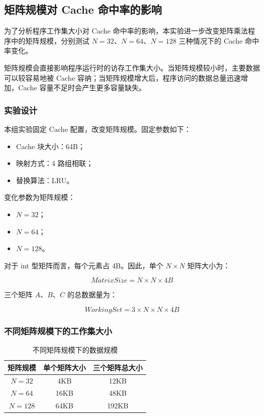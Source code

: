 \subsection{矩阵规模对 Cache 命中率的影响}

为了分析程序工作集大小对 Cache 命中率的影响，本实验进一步改变矩阵乘法程序中的矩阵规模，分别测试 $N=32$、$N=64$、$N=128$ 三种情况下的 Cache 命中率变化。

矩阵规模会直接影响程序运行时的访存工作集大小。当矩阵规模较小时，主要数据可以较容易地被 Cache 容纳；当矩阵规模增大后，程序访问的数据总量迅速增加，Cache 容量不足时会产生更多容量缺失。

\subsubsection{实验设计}

本组实验固定 Cache 配置，改变矩阵规模。固定参数如下：

\begin{itemize}
    \item Cache 块大小：64B；
    \item 映射方式：4 路组相联；
    \item 替换算法：LRU。
\end{itemize}

变化参数为矩阵规模：

\begin{itemize}
    \item $N=32$；
    \item $N=64$；
    \item $N=128$。
\end{itemize}

对于 int 型矩阵而言，每个元素占 4B。因此，单个 $N \times N$ 矩阵大小为：

\[
MatrixSize = N \times N \times 4B
\]

三个矩阵 $A$、$B$、$C$ 的总数据量为：

\[
WorkingSet = 3 \times N \times N \times 4B
\]

\subsubsection{不同矩阵规模下的工作集大小}

\begin{table}[H]
\centering
\caption{不同矩阵规模下的数据规模}
\begin{tabular}{c|c|c}
\hline
矩阵规模 & 单个矩阵大小 & 三个矩阵总大小 \\
\hline
$N=32$  & 4KB  & 12KB \\
$N=64$  & 16KB & 48KB \\
$N=128$ & 64KB & 192KB \\
\hline
\end{tabular}
\end{table}

